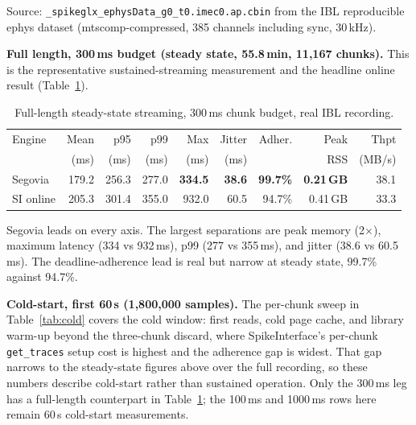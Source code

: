\documentclass[11pt]{article}
\begin{document}
Source: \texttt{\_spikeglx\_ephysData\_g0\_t0.imec0.ap.cbin} from the IBL reproducible ephys dataset
\citep{IBL2025} (mtscomp-compressed, 385 channels including sync, 30\,kHz).

\textbf{Full length, 300\,ms budget (steady state, 55.8\,min, 11{,}167 chunks).} This is the
representative sustained-streaming measurement and the headline online result (Table~\ref{tab:steady}).

\begin{table}[h]
\centering
\small
\caption{Full-length steady-state streaming, 300\,ms chunk budget, real IBL recording.}
\label{tab:steady}
\begin{tabular}{lrrrrrrrr}
\toprule
Engine & Mean & p95 & p99 & Max & Jitter & Adher. & Peak & Thpt \\
 & (ms) & (ms) & (ms) & (ms) & (ms) & & RSS & (MB/s) \\
\midrule
Segovia & 179.2 & 256.3 & 277.0 & \textbf{334.5} & \textbf{38.6} & \textbf{99.7\%} & \textbf{0.21\,GB} & 38.1 \\
SI online & 205.3 & 301.4 & 355.0 & 932.0 & 60.5 & 94.7\% & 0.41\,GB & 33.3 \\
\bottomrule
\end{tabular}
\end{table}

Segovia leads on every axis. The largest separations are peak memory (2$\times$), maximum latency
(334 vs 932\,ms), p99 (277 vs 355\,ms), and jitter (38.6 vs 60.5\,ms). The deadline-adherence lead is
real but narrow at steady state, 99.7\% against 94.7\%.

\textbf{Cold-start, first 60\,s (1{,}800{,}000 samples).} The per-chunk sweep in
Table~\ref{tab:cold} covers the cold window: first reads, cold page cache, and library warm-up beyond
the three-chunk discard, where SpikeInterface's per-chunk \texttt{get\_traces} setup cost is highest
and the adherence gap is widest. That gap narrows to the steady-state figures above over the full
recording, so these numbers describe cold-start rather than sustained operation. Only the 300\,ms leg
has a full-length counterpart in Table~\ref{tab:steady}; the 100\,ms and 1000\,ms rows here remain
60\,s cold-start measurements.
\end{document}
